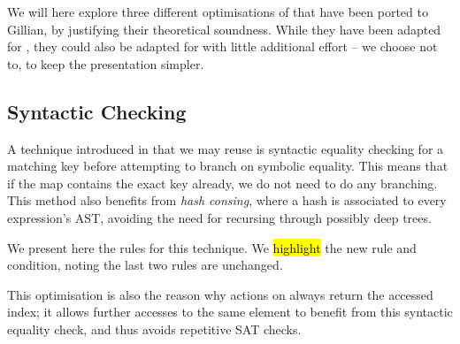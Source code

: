 We will here explore three different optimisations of \PMap{} that have been ported to Gillian, by justifying their theoretical soundness. While they have been adapted for \PMap{}, they could also be adapted for \GMap{} with little additional effort -- we choose not to, to keep the presentation simpler.

\subsection{Syntactic Checking}

A technique introduced in \cite{sacha-phd} that we may reuse is syntactic equality checking for a matching key before attempting to branch on symbolic equality. This means that if the map contains the exact key already, we do not need to do any branching. This method also benefits from \emph{hash consing}, where a hash is associated to every expression's AST, avoiding the need for recursing through possibly deep trees. 

We present here the rules for this technique. We \hl{highlight} the new rule and condition, noting the last two rules are unchanged.


This optimisation is also the reason why actions on \PMap{} always return the accessed index; it allows further accesses to the same element to benefit from this syntactic equality check, and thus avoids repetitive SAT checks.

